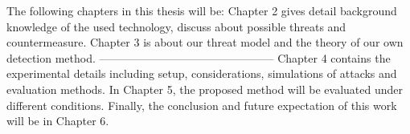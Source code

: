 The following chapters in this thesis will be: Chapter 2 gives detail background knowledge of the used technology, discuss about possible threats and countermeasure. Chapter 3 is about our threat model and the theory of our own detection method. 
-----------------------------------------------
Chapter 4 contains the experimental details including setup, considerations, simulations of attacks and evaluation methods. In Chapter 5, the proposed method will be evaluated under different conditions. Finally, the conclusion and future expectation of this work will be in Chapter 6.